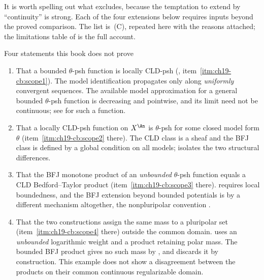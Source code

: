 It is worth spelling out what  excludes,
because the temptation to extend  by
``continuity'' is strong.  Each of the four extensions below requires inputs
beyond the proved comparison.  The list is
\,(C), repeated here with the reasons
attached; the limitations table of  is the full
account.

\begin{warning}{Four statements this book does not prove}
\label{warn:ch24-comparison-nonclaims}
\begin{enumerate}
\item\label{itm:ch24-notproved:psh}
 That a bounded $\theta$-psh function is locally CLD-psh
 (, item~\cref{itm:ch19-cb:scope1}).  The
 model identification propagates only along \emph{uniformly} convergent
 sequences.  The available model approximation for a general bounded
 $\theta$-psh function is decreasing and pointwise, and its limit need
 not be continuous; see
  for such a function.
\item\label{itm:ch24-notproved:converse}
 That a locally CLD-psh function on $X^{\An}$ is $\theta$-psh for some
 closed model form $\theta$ (item~\cref{itm:ch19-cb:scope2} there).  The
 CLD class is a sheaf and the BFJ class is defined by a global condition on
 all models;  isolates the two structural
 differences.
\item\label{itm:ch24-notproved:unbounded}
 That the BFJ monotone product of an \emph{unbounded} $\theta$-psh
 function equals a CLD Bedford--Taylor product
 (item~\cref{itm:ch19-cb:scope3} there).  
 requires local boundedness, and the BFJ extension beyond bounded
 potentials is by a different mechanism altogether, the nonpluripolar
 convention .
\item\label{itm:ch24-notproved:polar}
 That the two constructions assign the same mass to a pluripolar set
 (item~\cref{itm:ch19-cb:scope4} there) outside the common domain.
  uses an \emph{unbounded} logarithmic weight
 and a product retaining polar mass.  The bounded BFJ product gives no
 such mass by , and
  discards it by construction.  This example
 does not show a disagreement between the products on their common
 continuous regularizable domain.
\end{enumerate}
\end{warning}

